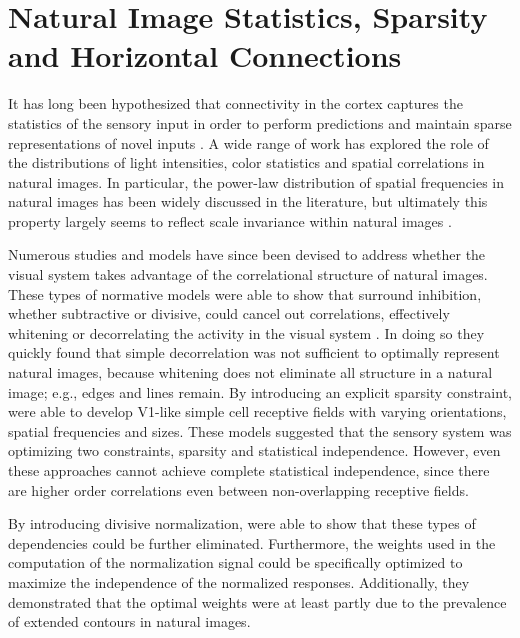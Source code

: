 \section{Natural Image Statistics, Sparsity and Horizontal Connections}

It has long been hypothesized that connectivity in the cortex captures
the statistics of the sensory input in order to perform predictions
and maintain sparse representations of novel inputs
\citep{Simoncelli2001}. A wide range of work has explored the role of
the distributions of light intensities, color statistics and spatial
correlations in natural images. In particular, the power-law
distribution of spatial frequencies in natural images has been widely
discussed in the literature, but ultimately this property largely seems to
reflect scale invariance within natural images
\citep{Ruderman1997}.

Numerous studies and models have since been devised to address whether
the visual system takes advantage of the correlational structure of
natural images. These types of normative models were able to show that
surround inhibition, whether subtractive or divisive, could cancel out
correlations, effectively whitening or decorrelating the activity in
the visual system \citep{Srinivasan1982, Atick1992}. In doing so they
quickly found that simple decorrelation was not sufficient to optimally
represent natural images, because whitening does not eliminate all
structure in a natural image; e.g., edges and lines remain. By
introducing an explicit sparsity constraint, \cite{Olshausen1996} were
able to develop V1-like simple cell receptive fields with varying
orientations, spatial frequencies and sizes. These models suggested
that the sensory system was optimizing two constraints, sparsity and
statistical independence. However, even these approaches cannot
achieve complete statistical independence, since there are higher order
correlations even between non-overlapping receptive fields.

By introducing divisive normalization, \cite{Schwartz2001a} were able
to show that these types of dependencies could be further
eliminated. Furthermore, the weights used in the computation of the
normalization signal could be specifically optimized to maximize the
independence of the normalized responses. Additionally, they
demonstrated that the optimal weights were at least partly due to the
prevalence of extended contours in natural images.

